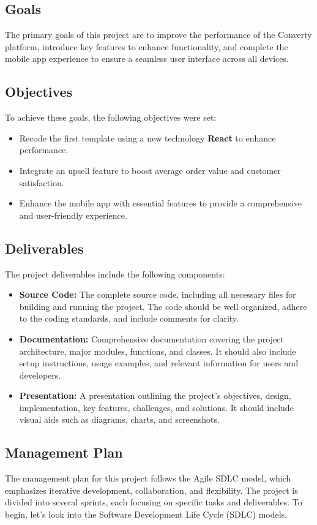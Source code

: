 \subsection{Goals}
The primary goals of this project are to improve the performance of the Converty platform, introduce key features to enhance functionality, and complete the mobile app experience to ensure a seamless user interface across all devices.

\subsection{Objectives}
To achieve these goals, the following objectives were set:
\begin{itemize}
    \item Recode the first template using a new technology \textbf{React} to enhance performance.
    \item Integrate an upsell feature to boost average order value and customer satisfaction.
    \item Enhance the mobile app with essential features to provide a comprehensive and user-friendly experience.
\end{itemize}

\subsection{Deliverables}
The project deliverables include the following components:
\begin{itemize}
    \item \textbf{Source Code:} The complete source code, including all necessary files for building and running the project. The code should be well organized, adhere to the coding standards, and include comments for clarity.
    \item \textbf{Documentation:} Comprehensive documentation covering the project architecture, major modules, functions, and classes. It should also include setup instructions, usage examples, and relevant information for users and developers.
    \item \textbf{Presentation:} A presentation outlining the project's objectives, design, implementation, key features, challenges, and solutions. It should include visual aids such as diagrams, charts, and screenshots.
\end{itemize}

\subsection{Management Plan}
The management plan for this project follows the Agile SDLC model, which emphasizes iterative development, collaboration, and flexibility. The project is divided into several sprints, each focusing on specific tasks and deliverables.
To begin, let's look into the Software Development Life Cycle (SDLC) models.

